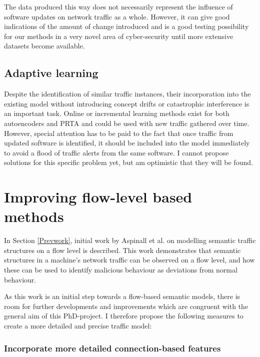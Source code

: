 \documentclass[a4paper,12pt,twoside]{report}
\begin{document}
The data produced this way does not necessarily represent the influence of software updates on network traffic as a whole. However, it can give good indications of the amount of change introduced and is a good testing possibility for our methods in a very novel area of cyber-security until more extensive datasets become available. 

\subsection{Adaptive learning}
Despite the identification of similar traffic instances, their incorporation into the existing model 
without introducing concept drifts or catastrophic interference is an important task. Online or incremental learning methods exist for both autoencoders and PRTA and could be used with new traffic gathered over time. However, special attention has to be paid to the fact that once traffic from updated software is identified, it should be included into the model immediately to avoid a flood of traffic alerts from the same software. I cannot propose solutions for this specific problem yet, but am optimistic that they will be found.

\section{Improving flow-level based methods}\label{Curmet}


In Section \ref{Prevwork}, initial work by Aspinall et al. on modelling semantic traffic structures on a flow level is described. This work demonstrates that semantic structures in a machine's network traffic can be observed on a flow level, and how these can be used to identify malicious behaviour as deviations from normal behaviour.

As this work is an initial step towards a flow-based semantic models, there is room for further developments and improvements which are congruent  with the general aim of this PhD-project. I therefore propose the following measures to create a more detailed and precise traffic model:

\subsubsection{Incorporate more detailed connection-based features}
\end{document}
